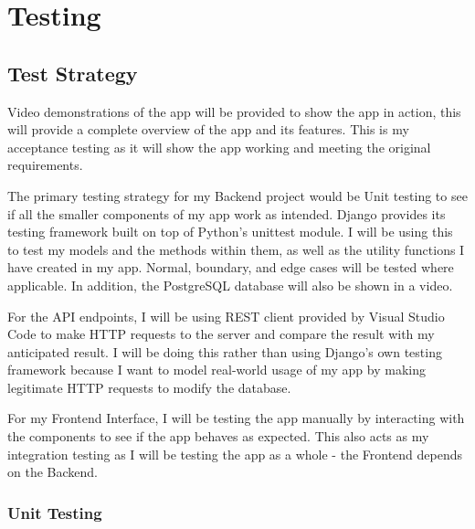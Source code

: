 \chapter{Testing}

\section{Test Strategy}
Video demonstrations of the app will be provided to show the app in action, this will provide a complete overview of the app and its features. This is my acceptance testing as it will show the app working and meeting the original requirements.

The primary testing strategy for my Backend project would be Unit testing to see if all the smaller components of my app work as intended. Django provides its testing framework built on top of Python's unittest module. I will be using this to test my models and the methods within them, as well as the utility functions I have created in my app. Normal, boundary, and edge cases will be tested where applicable. In addition, the PostgreSQL database will also be shown in a video.

For the API endpoints, I will be using REST client provided by Visual Studio Code to make HTTP requests to the server and compare the result with my anticipated result. I will be doing this rather than using Django's own testing framework because I want to model real-world usage of my app by making legitimate HTTP requests to modify the database.

For my Frontend Interface, I will be testing the app manually by interacting with the components to see if the app behaves as expected. This also acts as my integration testing as I will be testing the app as a whole - the Frontend depends on the Backend.

\subsection{Unit Testing}
